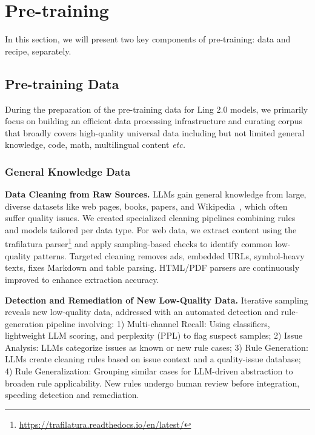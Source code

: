 \documentclass[table]{gtech}
\theoremstyle{definition}
\begin{document}
\section{Pre-training}\label{sec:pretrain}

In this section, we will present two key components of pre-training: data and recipe, separately.

\subsection{Pre-training Data}
During the preparation of the pre-training data for Ling 2.0 models, we primarily focus on building an efficient data processing infrastructure and curating corpus that broadly covers high-quality universal data including but not limited general knowledge, code, math, multilingual content \emph{etc.}

\subsubsection{General Knowledge Data}

{\bfseries Data Cleaning from Raw Sources.}
LLMs gain general knowledge from large, diverse datasets like web pages, books, papers, and Wikipedia~\citep{soldaini2024dolmaopencorpustrillion}, which often suffer quality issues. We created specialized cleaning pipelines combining rules and models tailored per data type. For web data, we extract content using the trafilatura parser\footnote{\url{https://trafilatura.readthedocs.io/en/latest/}} and apply sampling-based checks to identify common low-quality patterns. Targeted cleaning removes ads, embedded URLs, symbol-heavy texts, fixes Markdown and table parsing. HTML/PDF parsers are continuously improved to enhance extraction accuracy.

{\bfseries Detection and Remediation of New Low-Quality Data.} 
Iterative sampling reveals new low-quality data, addressed with an automated detection and rule-generation pipeline involving: 1) Multi-channel Recall: Using classifiers, lightweight LLM scoring, and perplexity (PPL) to flag suspect samples; 2) Issue Analysis: LLMs categorize issues as known or new rule cases; 3) Rule Generation: LLMs create cleaning rules based on issue context and a quality-issue database; 4) Rule Generalization: Grouping similar cases for LLM-driven abstraction to broaden rule applicability. New rules undergo human review before integration, speeding detection and remediation.
\end{document}
